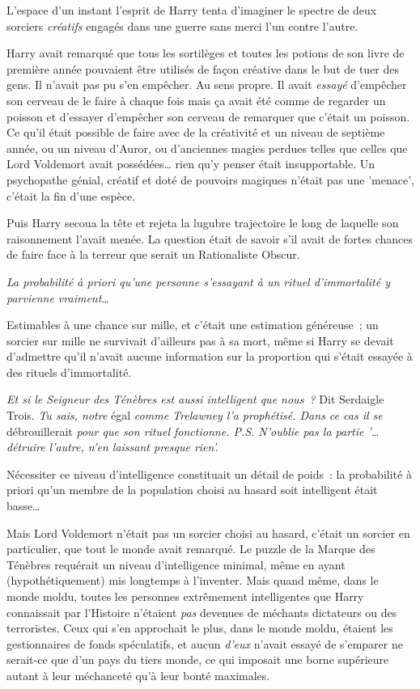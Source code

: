 L'espace d'un instant l'esprit de Harry tenta d'imaginer le spectre de deux sorciers \emph{créatifs} engagés dans une guerre sans merci l'un contre l'autre.

Harry avait remarqué que tous les sortilèges et toutes les potions de son livre de première année pouvaient être utilisés de façon créative dans le but de tuer des gens. Il n'avait pas pu s'en empêcher. Au sens propre. Il avait \emph{essayé} d'empêcher son cerveau de le faire à chaque fois mais ça avait été comme de regarder un poisson et d'essayer d'empêcher son cerveau de remarquer que c'était un poisson. Ce qu'il était possible de faire avec de la créativité et un niveau de septième année, ou un niveau d'Auror, ou d'anciennes magies perdues telles que celles que Lord Voldemort avait possédées… rien qu'y penser était insupportable. Un psychopathe génial, créatif et doté de pouvoirs magiques n'était pas une 'menace', c'était la fin d'une espèce.

Puis Harry secoua la tête et rejeta la lugubre trajectoire le long de laquelle son raisonnement l'avait menée. La question était de savoir s'il avait de fortes chances de faire face à la terreur que serait un Rationaliste Obscur.

\emph{La probabilité à priori qu'une personne s'essayant à un rituel d'immortalité y parvienne vraiment…}

Estimables à une chance sur mille, et c'était une estimation généreuse~; un sorcier sur mille ne survivait d'ailleurs pas à sa mort, même si Harry se devait d'admettre qu'il n'avait aucune information sur la proportion qui s'était essayée à des rituels d'immortalité.

\emph{Et si le Seigneur des Ténèbres est aussi intelligent que nous~?} Dit Serdaigle Trois. \emph{Tu sais, notre} égal \emph{comme Trelawney l'a prophétisé. Dans ce cas il se} débrouillerait \emph{pour que son rituel fonctionne. P.S. N'oublie pas la partie '… détruire l'autre, n'en laissant presque rien'.}

Nécessiter ce niveau d'intelligence constituait un détail de poids~: la probabilité à priori qu'un membre de la population choisi au hasard soit intelligent était basse…

Mais Lord Voldemort n'était pas un sorcier choisi au hasard, c'était un sorcier en particulier, que tout le monde avait remarqué. Le puzzle de la Marque des Ténèbres requérait un niveau d'intelligence minimal, même en ayant (hypothétiquement) mis longtemps à l'inventer. Mais quand même, dans le monde moldu, toutes les personnes extrêmement intelligentes que Harry connaissait par l'Histoire n'étaient \emph{pas} devenues de méchants dictateurs ou des terroristes. Ceux qui s'en approchait le plus, dans le monde moldu, étaient les gestionnaires de fonds spéculatifs, et aucun \emph{d'eux} n'avait essayé de s'emparer ne serait-ce que d'un pays du tiers monde, ce qui imposait une borne supérieure autant à leur méchanceté qu'à leur bonté maximales.

